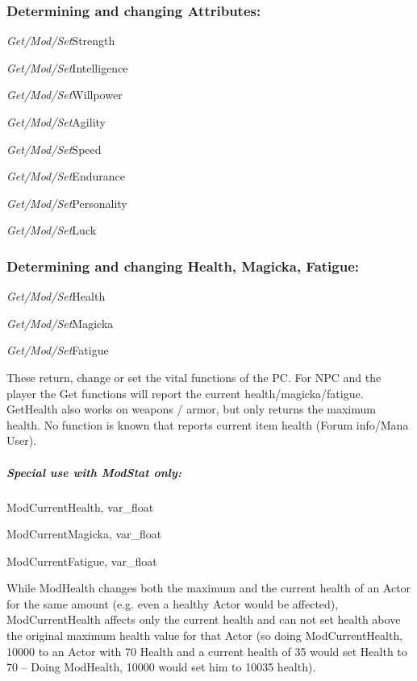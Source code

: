 \hypertarget{determining-and-changing-attributes}{%
\subsubsection{Determining and changing
Attributes:}\label{determining-and-changing-attributes}}

\emph{Get/Mod/Set}Strength

\emph{Get/Mod/Set}Intelligence

\emph{Get/Mod/Set}Willpower

\emph{Get/Mod/Set}Agility

\emph{Get/Mod/Set}Speed

\emph{Get/Mod/Set}Endurance

\emph{Get/Mod/Set}Personality

\emph{Get/Mod/Set}Luck

\hypertarget{determining-and-changing-health-magicka-fatigue}{%
\subsubsection{Determining and changing Health, Magicka,
Fatigue:}\label{determining-and-changing-health-magicka-fatigue}}

\emph{Get/Mod/Set}Health

\emph{Get/Mod/Set}Magicka

\emph{Get/Mod/Set}Fatigue

These return, change or set the vital functions of the PC. For NPC and
the player the Get functions will report the current
health/magicka/fatigue. GetHealth also works on weapons / armor, but
only returns the maximum health. No function is known that reports
current item health (Forum info/Mana User).

\hypertarget{special-use-with-modstat-only}{%
\subparagraph{\texorpdfstring{Special use with Mod\emph{Stat}
only:}{Special use with ModStat only:}}\label{special-use-with-modstat-only}}

ModCurrentHealth, var\_float

ModCurrentMagicka, var\_float

ModCurrentFatigue, var\_float

While ModHealth changes both the maximum and the current health of an
Actor for the same amount (e.g. even a healthy Actor would be affected),
ModCurrentHealth affects only the current health and can not set health
above the original maximum health value for that Actor (so doing
ModCurrentHealth, 10000 to an Actor with 70 Health and a current health
of 35 would set Health to 70 -- Doing ModHealth, 10000 would set him to
10035 health).

